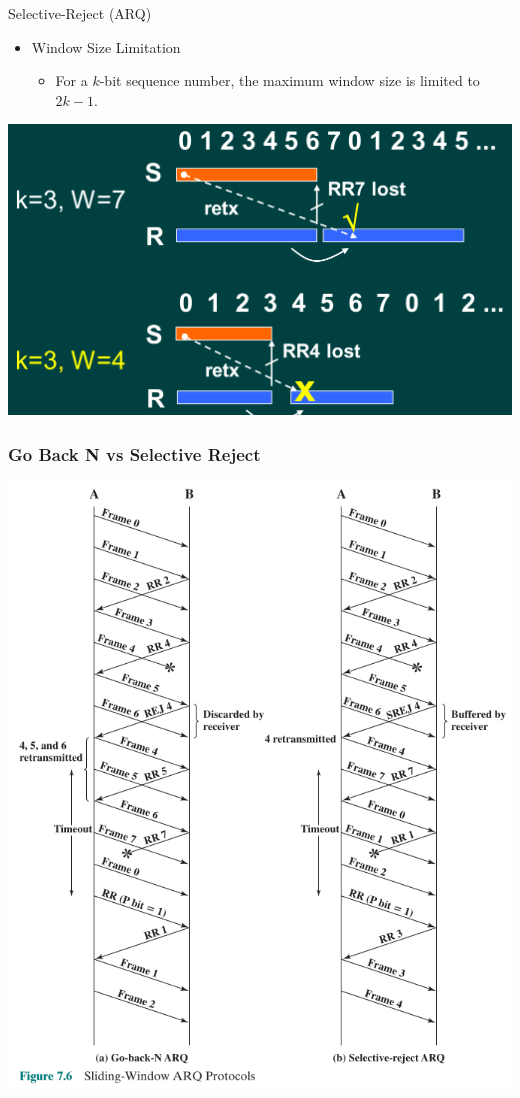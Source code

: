 \documentclass[pdflatex,compress]{beamer}
\begin{document}
\begin{frame}{Selective-Reject (ARQ)}
	\begin{itemize}
		\item Window Size Limitation
		\begin{itemize}
			\item For a $ k $-bit sequence number, the maximum window size is limited to $ 2k-1 $.
		\end{itemize}
	\end{itemize}
	\begin{center}
		\includegraphics[height=0.6\textheight]{img/img06}
	\end{center}
\end{frame}

\begin{frame}
	\frametitle{Go Back N vs Selective Reject}
	\begin{center}
		\includegraphics[height=0.9\textheight]{img/img07}
	\end{center}
\end{frame}
\end{document}
